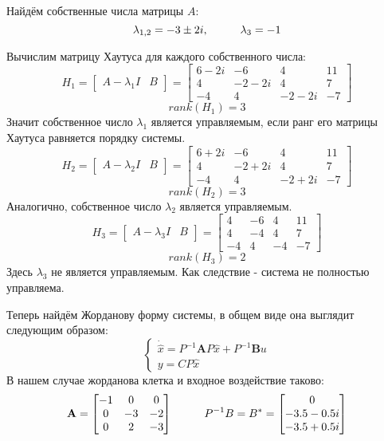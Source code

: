 Найдём собственные числа матрицы $A$:
$$
    \lambda_{1,2} = -3 \pm 2i, \hspace*{1cm} \lambda_3 = -1 
$$

Вычислим матрицу Хаутуса для каждого собственного числа:
$$
    H_1 = \begin{bmatrix}
          A - \lambda_1 I & B   
          \end{bmatrix} = 
    \begin{bmatrix}
    6-2i & -6 & 4 & 11 \\  
    4 & -2-2i & 4 & 7 \\  
    -4 & 4 & -2 -2i & -7   
    \end{bmatrix}
$$
$$
rank(H_1) = 3
$$
Значит собственное число $\lambda_1$ является управляемым, если ранг его матрицы Хаутуса равняется порядку системы.
$$
    H_2 = \begin{bmatrix}
          A - \lambda_2 I & B   
          \end{bmatrix} = 
    \begin{bmatrix}
      6+2i & -6 & 4 & 11 \\  
      4 & -2+2i & 4 & 7 \\  
      -4 & 4 & -2+2i & -7  
    \end{bmatrix}
$$
$$
rank(H_2) = 3
$$
Аналогично, собственное число $\lambda_2$ является управляемым.
$$
    H_3 = \begin{bmatrix}
          A - \lambda_3 I & B   
          \end{bmatrix} = 
    \begin{bmatrix}
      4 & -6 & 4 & 11 \\
      4 & -4 & 4 & 7 \\
      -4 & 4 & -4 & -7
    \end{bmatrix}
$$
$$
rank(H_3) = 2
$$
Здесь  $\lambda_3$ не является управляемым. Как следствие - система не полностью управляема.

Теперь найдём Жорданову форму системы, в общем виде она выглядит следующим образом:
$$
    \begin{cases}
      \dot{\hat{x}} = P^{-1}\boldsymbol{A}P \hat{x} + P^{-1}\boldsymbol{B} u \\
      y = CP\hat{x}
    \end{cases}
$$
В нашем случае жорданова клетка и входное воздействие таково:
$$
    \mathbf{A} = \begin{bmatrix}
        -1 & 0 & 0 \\
        0 & -3 & -2 \\
        0 & 2 & -3 
        \end{bmatrix} \hspace*{1cm} 
    P^{-1}B = B^* = \begin{bmatrix}
        0 \\ -3.5-0.5i \\ -3.5+0.5i
        \end{bmatrix}
$$


